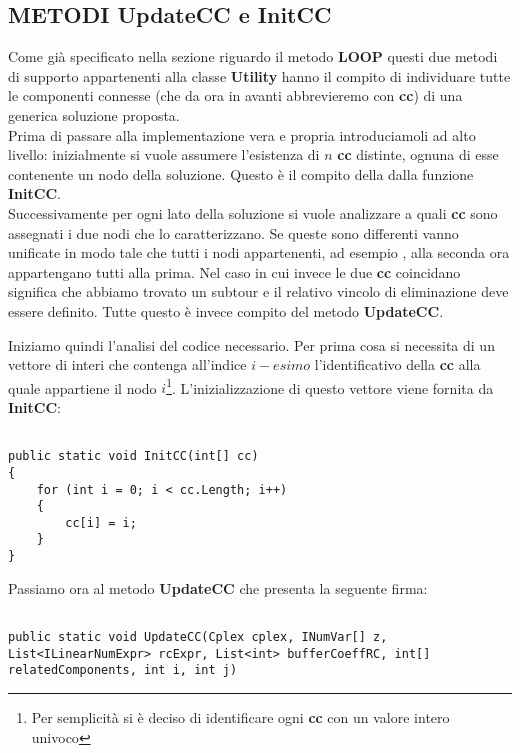 \documentclass[11pt]{article}
\begin{document}
\subsection*{METODI UpdateCC e InitCC}
\label{sec:UCCICCS}

Come già specificato nella sezione riguardo il metodo \textbf{LOOP} questi due metodi di supporto appartenenti alla classe \textbf{Utility} hanno il compito di individuare tutte le componenti connesse (che da ora in avanti abbrevieremo con \textbf{cc}) di una generica soluzione proposta.\\
Prima di passare alla implementazione vera e propria introduciamoli ad alto livello: inizialmente si vuole assumere l'esistenza di $n$ \textbf{cc} distinte, ognuna di esse contenente un nodo della soluzione. Questo è il compito della dalla funzione \textbf{InitCC}.\\
Successivamente per ogni lato della soluzione si vuole analizzare a quali \textbf{cc} sono assegnati i due nodi che lo caratterizzano. Se queste sono differenti vanno unificate in modo tale che tutti i nodi appartenenti, ad esempio
, alla seconda ora appartengano tutti alla prima. Nel caso in cui invece le due \textbf{cc} coincidano significa che abbiamo trovato un subtour e il relativo vincolo di eliminazione deve essere definito. Tutte questo è invece compito del metodo \textbf{UpdateCC}.

Iniziamo quindi l'analisi del codice necessario. Per prima cosa si necessita di un vettore di interi che contenga all'indice $i-esimo$ l'identificativo della \textbf{cc} alla quale appartiene il nodo $i$\footnote{Per semplicità si è deciso di identificare ogni \textbf{cc} con un valore intero univoco}. L'inizializzazione di questo vettore viene fornita da \textbf{InitCC}:

\begin{lstlisting}

public static void InitCC(int[] cc)
{
    for (int i = 0; i < cc.Length; i++)
    {
        cc[i] = i;
    }
}

\end{lstlisting}

Passiamo ora al metodo \textbf{UpdateCC} che presenta la seguente firma:

\begin{lstlisting}

public static void UpdateCC(Cplex cplex, INumVar[] z, List<ILinearNumExpr> rcExpr, List<int> bufferCoeffRC, int[] relatedComponents, int i, int j)

\end{lstlisting}
\end{document}
